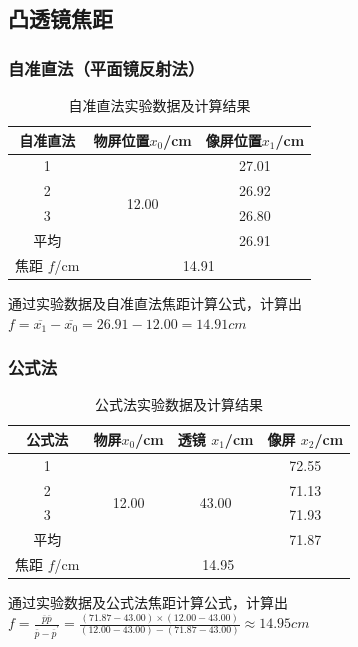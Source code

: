 \documentclass[12pt,a4paper]{article}
\begin{document}
		\subsection{凸透镜焦距}	
			\subsubsection{自准直法（平面镜反射法）}
				\begin{table}[h]
				\centering
				\renewcommand{\arraystretch}{1.2}
				\begin{tabular}{|c|c|c|}
					\hline
					自准直法 & 物屏位置$x_0$/cm & 像屏位置$x_1$/cm \\
					\hline
					1 & \multirow{4}{*}{12.00} & 27.01 \\
					\cline{1-1} \cline{3-3}
					2 &  & 26.92 \\
					\cline{1-1} \cline{3-3}
					3 &  & 26.80 \\
					\cline{1-1} \cline{3-3}
					平均 &  & 26.91 \\
					\hline
					焦距 $f$/cm & \multicolumn{2}{c|}{14.91} \\
					\hline
				\end{tabular}
				\caption{自准直法实验数据及计算结果}
				\end{table}
				通过实验数据及自准直法焦距计算公式，计算出
				$f=\overline{x_{1}}-\overline{x_{0}}=26.91-12.00=14.91cm$
				
			\subsubsection{公式法}
				\begin{table}[h]
					\centering
					\renewcommand{\arraystretch}{1.2}
					\begin{tabular}{|c|c|c|c|}
						\hline
						公式法 & 物屏$x_0$/cm & 透镜 $x_1$/cm & 像屏 $x_2$/cm \\
						\hline
						1 & \multirow{4}{*}{12.00} & \multirow{4}{*}{43.00} & 72.55 \\
						\cline{1-1} \cline{4-4}
						2 &  &  & 71.13 \\
						\cline{1-1} \cline{4-4}
						3 &  &  & 71.93 \\
						\cline{1-1} \cline{4-4}
						平均 &  &  & 71.87 \\
						\hline
						焦距 $f$/cm & \multicolumn{3}{c|}{14.95} \\
						\hline
					\end{tabular}
					\caption{公式法实验数据及计算结果}
				\end{table}
				通过实验数据及公式法焦距计算公式，计算出
				$f=\frac{\overline{p}\overline{p}}{\overline{p}-\overline{p}^{\prime}}=\frac{(71.87-43.00)\times (12.00-43.00) }{(12.00-43.00)-(71.87-43.00)} \approx 14.95cm$
				
\end{document}
